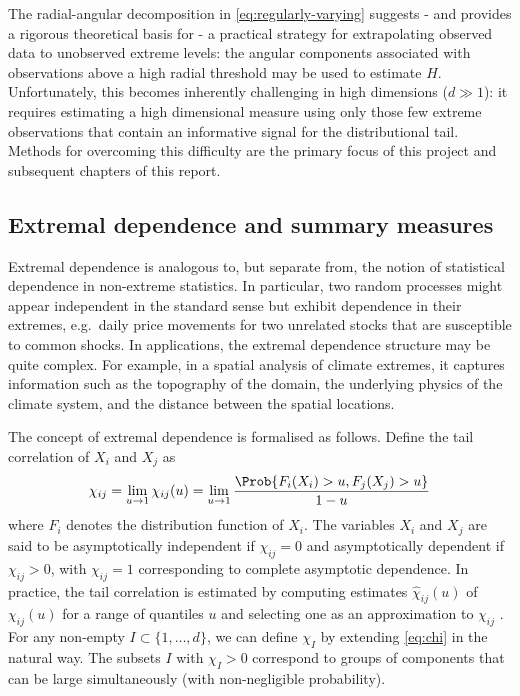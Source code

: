 \documentclass[en-GB, a4paper, nobind]{templates/bathreport}
\begin{document}
The radial-angular decomposition in \eqref{eq:regularly-varying} suggests - and provides a rigorous theoretical basis for - a practical strategy for extrapolating observed data to unobserved extreme levels: the angular components associated with observations above a high radial threshold may be used to estimate \(H\). Unfortunately, this becomes inherently challenging in high dimensions (\(d\gg 1\)): it requires estimating a high dimensional measure using only those few extreme observations that contain an informative signal for the distributional tail. Methods for overcoming this difficulty are the primary focus of this project and subsequent chapters of this report.

\hypertarget{extremal-dependence}{%
\subsection{Extremal dependence and summary measures}\label{extremal-dependence}}

Extremal dependence is analogous to, but separate from, the notion of statistical dependence in non-extreme statistics. In particular, two random processes might appear independent in the standard sense but exhibit dependence in their extremes, e.g.~daily price movements for two unrelated stocks that are susceptible to common shocks. In applications, the extremal dependence structure may be quite complex. For example, in a spatial analysis of climate extremes, it captures information such as the topography of the domain, the underlying physics of the climate system, and the distance between the spatial locations.

The concept of extremal dependence is formalised as follows. Define the tail correlation of \(X_i\) and \(X_j\) as
\begin{equation}
\chi_{ij} = \lim_{u\to 1}\chi_{ij}(u) = \lim_{u\to 1} \frac{\Prob{F_i(X_i)>u, F_j(X_j)>u}}{1-u}
\label{eq:chi}
\end{equation}
where \(F_i\) denotes the distribution function of \(X_i\). The variables \(X_i\) and \(X_j\) are said to be asymptotically independent if \(\chi_{ij}=0\) and asymptotically dependent if \(\chi_{ij}>0\), with \(\chi_{ij}=1\) corresponding to complete asymptotic dependence. In practice, the tail correlation is estimated by computing estimates \(\hat{\chi}_{ij}(u)\) of \(\chi_{ij}(u)\) for a range of quantiles \(u\) and selecting one as an approximation to \(\chi_{ij}\) \autocite[Figure 2]{engelkeSparseStructuresMultivariate2021}. For any non-empty \(I\subset\{1,\ldots,d\}\), we can define \(\chi_I\) by extending \eqref{eq:chi} in the natural way. The subsets \(I\) with \(\chi_I>0\) correspond to groups of components that can be large simultaneously (with non-negligible probability).
\end{document}
